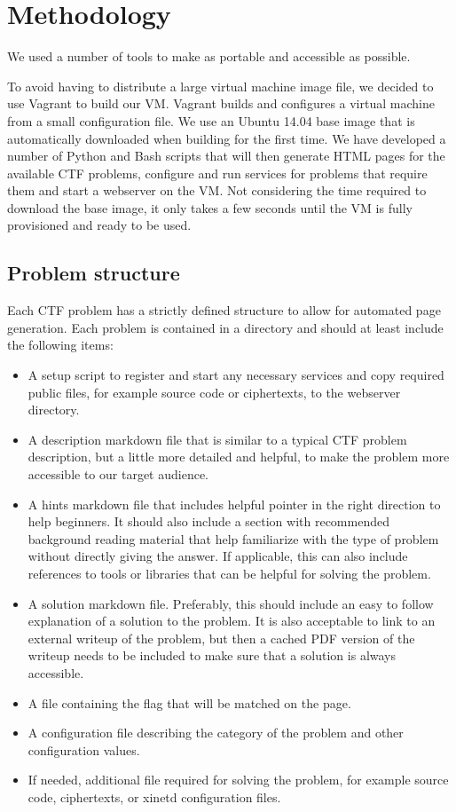 \section{Methodology}
\label{sec:methodology}
We used a number of tools to make \cvm{} as portable and accessible as
possible.

To avoid having to distribute a large virtual machine image file, we
decided to use Vagrant to build our VM. Vagrant builds and configures
a virtual machine from a small configuration file. We use an Ubuntu
14.04 base image that is automatically downloaded when building \cvm{}
for the first time. We have developed a number of Python and Bash
scripts that will then generate HTML pages for the available CTF
problems, configure and run services for problems that require them
and start a webserver on the VM. Not considering the time required to
download the base image, it only takes a few seconds until the VM is
fully provisioned and ready to be used.

\subsection{Problem structure}
Each CTF problem has a strictly defined structure to allow for
automated page generation. Each problem is contained in a directory
and should at least include the following items:

\begin{itemize}
  \item A setup script to register and start any necessary services
    and copy required public files, for example source code or
    ciphertexts, to the webserver directory.
  \item A description markdown file that is similar to a typical CTF
    problem description, but a little more detailed and helpful, to
    make the problem more accessible to our target audience.
  \item A hints markdown file that includes helpful pointer in the
    right direction to help beginners. It should also include a
    section with recommended background reading material that help
    familiarize with the type of problem without directly giving the
    answer. If applicable, this can also include references to tools
    or libraries that can be helpful for solving the problem.
  \item A solution markdown file. Preferably, this should include an
    easy to follow explanation of a solution to the problem. It is
    also acceptable to link to an external writeup of the problem, but
    then a cached PDF version of the writeup needs to be included to
    make sure that a solution is always accessible.
  \item A file containing the flag that will be matched on the page.
  \item A configuration file describing the category of the problem
    and other configuration values.
  \item If needed, additional file required for solving the problem,
    for example source code, ciphertexts, or xinetd configuration
    files.
\end{itemize}

